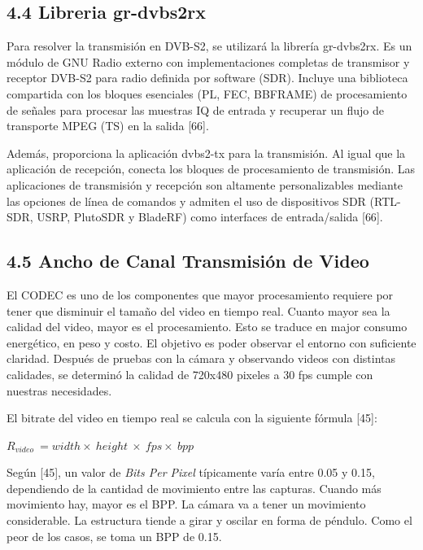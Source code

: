 \documentclass[12pt,a4paper]{article}
\begin{document}
\subsection{\texorpdfstring{4\textbf{.}4 \textbf{Libreria gr-dvbs2rx}}{4.4 Libreria gr-dvbs2rx}}\label{libreria-gr-dvbs2rx}

Para resolver la transmisión en DVB-S2, se utilizará la librería gr-dvbs2rx. Es un módulo de GNU Radio externo con implementaciones completas de transmisor y receptor DVB-S2 para radio definida por software (SDR). Incluye una biblioteca compartida con los bloques esenciales (PL, FEC, BBFRAME) de procesamiento de señales para procesar las muestras IQ de entrada y recuperar un flujo de transporte MPEG (TS) en la salida {[}66{]}.

Además, proporciona la aplicación dvbs2-tx para la transmisión. Al igual que la aplicación de recepción, conecta los bloques de procesamiento de transmisión. Las aplicaciones de transmisión y recepción son altamente personalizables mediante las opciones de línea de comandos y admiten el uso de dispositivos SDR (RTL-SDR, USRP, PlutoSDR y BladeRF) como interfaces de entrada/salida {[}66{]}.

\subsection{4.5 Ancho de Canal Transmisión de Video}\label{ancho-de-canal-transmisiuxf3n-de-video}

El CODEC es uno de los componentes que mayor procesamiento requiere por tener que disminuir el tamaño del video en tiempo real. Cuanto mayor sea la calidad del video, mayor es el procesamiento. Esto se traduce en major consumo energético, en peso y costo. El objetivo es poder observar el entorno con suficiente claridad. Después de pruebas con la cámara y observando videos con distintas calidades, se determinó la calidad de 720x480 pixeles a 30 fps cumple con nuestras necesidades.

El bitrate del video en tiempo real se calcula con la siguiente fórmula {[}45{]}:

\(R_{video}\  = width \times \ height\  \times \ fps \times \ bpp\)

Según {[}45{]}, un valor de \emph{Bits Per Pixel} típicamente varía entre 0.05 y 0.15, dependiendo de la cantidad de movimiento entre las capturas. Cuando más movimiento hay, mayor es el BPP. La cámara va a tener un movimiento considerable. La estructura tiende a girar y oscilar en forma de péndulo. Como el peor de los casos, se toma un BPP de 0.15.
\end{document}
